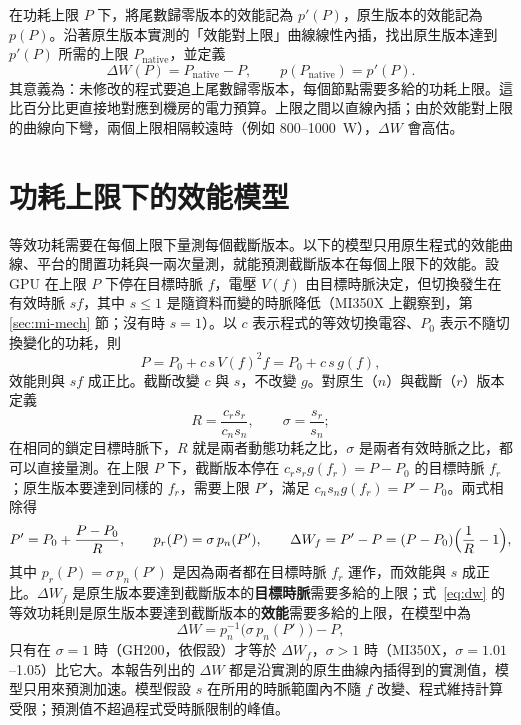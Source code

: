 在功耗上限 $P$ 下，將尾數歸零版本的效能記為 $p'(P)$，原生版本的效能記為 $p(P)$。沿著原生版本實測的「效能對上限」曲線線性內插，找出原生版本達到 $p'(P)$ 所需的上限 $P_{\mathrm{native}}$，並定義
\begin{equation}
  \Delta W(P) = P_{\mathrm{native}} - P, \qquad p(P_{\mathrm{native}}) = p'(P) .
  \label{eq:dw}
\end{equation}
其意義為：未修改的程式要追上尾數歸零版本，每個節點需要多給的功耗上限。這比百分比更直接地對應到機房的電力預算。上限之間以直線內插；由於效能對上限的曲線向下彎，兩個上限相隔較遠時（例如 800–1000~W），$\Delta W$ 會高估。

\section{功耗上限下的效能模型}\label{sec:powermodel}

等效功耗需要在每個上限下量測每個截斷版本。以下的模型只用原生程式的效能曲線、平台的閒置功耗與一兩次量測，就能預測截斷版本在每個上限下的效能。設 GPU 在上限 $P$ 下停在目標時脈 $f$，電壓 $V(f)$ 由目標時脈決定，但切換發生在有效時脈 $sf$，其中 $s\le1$ 是隨資料而變的時脈降低（MI350X 上觀察到，第 \ref{sec:mi-mech} 節；沒有時 $s=1$）。以 $c$ 表示程式的等效切換電容、$P_0$ 表示不隨切換變化的功耗，則
\begin{equation}
  P = P_0 + c\,s\,V(f)^2 f = P_0 + c\,s\,g(f),
  \label{eq:pmodel}
\end{equation}
效能則與 $sf$ 成正比。截斷改變 $c$ 與 $s$，不改變 $g$。對原生（$n$）與截斷（$r$）版本定義
\begin{equation}
  R = \frac{c_r s_r}{c_n s_n}, \qquad \sigma = \frac{s_r}{s_n} ;
  \label{eq:rsigma}
\end{equation}
在相同的鎖定目標時脈下，$R$ 就是兩者動態功耗之比，$\sigma$ 是兩者有效時脈之比，都可以直接量測。在上限 $P$ 下，截斷版本停在 $c_r s_r g(f_r) = P - P_0$ 的目標時脈 $f_r$；原生版本要達到同樣的 $f_r$，需要上限 $P'$，滿足 $c_n s_n g(f_r) = P' - P_0$。兩式相除得
\begin{equation}
  P' = P_0 + \frac{P-P_0}{R}, \qquad p_r(P) = \sigma\, p_n(P'), \qquad
  \Delta W_f = P' - P = (P-P_0)\Bigl(\frac{1}{R}-1\Bigr),
  \label{eq:pmodel-pred}
\end{equation}
其中 $p_r(P)=\sigma\,p_n(P')$ 是因為兩者都在目標時脈 $f_r$ 運作，而效能與 $s$ 成正比。$\Delta W_f$ 是原生版本要達到截斷版本的\textbf{目標時脈}需要多給的上限；式~\eqref{eq:dw} 的等效功耗則是原生版本要達到截斷版本的\textbf{效能}需要多給的上限，在模型中為
\begin{equation}
  \Delta W = p_n^{-1}\!\bigl(\sigma\,p_n(P')\bigr) - P ,
  \label{eq:pmodel-dw}
\end{equation}
只有在 $\sigma=1$ 時（GH200，依假設）才等於 $\Delta W_f$，$\sigma>1$ 時（MI350X，$\sigma=1.01$–1.05）比它大。本報告列出的 $\Delta W$ 都是沿實測的原生曲線內插得到的實測值，模型只用來預測加速。模型假設 $s$ 在所用的時脈範圍內不隨 $f$ 改變、程式維持計算受限；預測值不超過程式受時脈限制的峰值。

